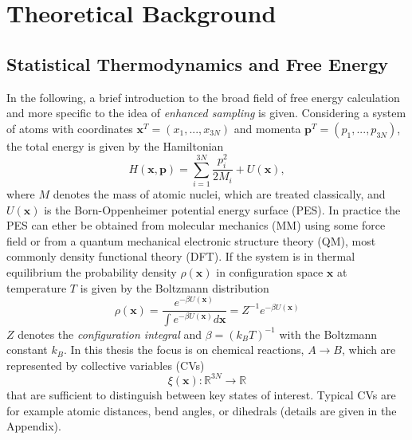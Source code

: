 \chapter{Theoretical Background}
\label{cha:theory}

\section{Statistical Thermodynamics and Free Energy}
\label{sec:freeE}

In the following, a brief introduction to the broad field of free energy calculation\autocite{chipot2007free} and more specific to the idea of \textit{enhanced sampling}\autocite{bernardi2015enhanced,abrams2014enhanced} is given.
Considering a system of atoms with coordinates $\textbf{x}^T=(x_1,...,x_{3N})$ and momenta $\textbf{p}^T=(p_1,...,p_{3N})$, the total energy is given by the Hamiltonian
\begin{equation}
  H(\textbf{x},\textbf{p})=\sum_{i=1}^{3N}\frac{p_{i}^{ 2}}{2 M_i} + U(\textbf{x}),
  \label{eq:lagrangian}
\end{equation}
where $M$ denotes the mass of atomic nuclei, which are treated classically, and $U(\textbf{x})$ is the Born-Oppenheimer potential energy surface (PES).\autocite{combes1981born}
In practice the PES can ether be obtained from molecular mechanics (MM) using some force field\autocite{ponder2003force} or from a quantum mechanical electronic structure theory (QM), most commonly density functional theory (DFT).\autocite{burke2012perspective}
If the system is in thermal equilibrium the probability density $\rho(\textbf{x})$ in configuration space $\textbf{x}$ at temperature $T$ is given by the Boltzmann distribution
\begin{equation}
  \rho(\textbf{x})=\frac{e^{-\beta U(\textbf{x})}}{\int e^{-\beta U(\textbf{x})} d\textbf{x}}=Z^{-1}e^{-\beta U(\textbf{x})}
  \label{eq:boltzmann}
\end{equation}
$Z$ denotes the \textit{configuration integral} and $\beta=(k_B T)^{-1}$ with the Boltzmann constant $k_B$.\autocite{chipot2007free}
In this thesis the focus is on chemical reactions, $A \longrightarrow B$, which are represented by collective variables (CVs)
\begin{equation}
 \xi(\textbf{x}) : \mathbb{R} ^{3N} \to \mathbb{R}
\end{equation}
that are sufficient to distinguish between key states of interest.
Typical CVs are for example atomic distances, bend angles, or dihedrals (details are given in the Appendix).\autocite{fiorin2013using}
